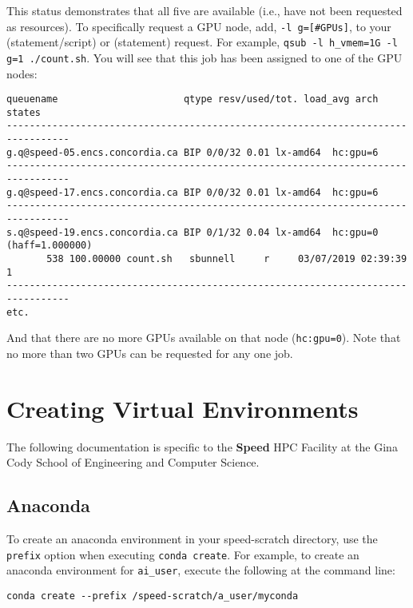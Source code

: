 \documentclass{easychair}
\begin{document}
This status demonstrates that all five are available (i.e., have not been 
requested as resources). To specifically request a GPU node, add,
\texttt{-l g=[\#GPUs]}, to your  (statement/script) or
 (statement) request. For example,
\texttt{qsub -l h\_vmem=1G -l g=1 ./count.sh}. You 
will see that this job has been assigned to one of the GPU nodes:

\small
\begin{verbatim}
queuename                      qtype resv/used/tot. load_avg arch          states
--------------------------------------------------------------------------------- 
g.q@speed-05.encs.concordia.ca BIP 0/0/32 0.01 lx-amd64  hc:gpu=6 
--------------------------------------------------------------------------------- 
g.q@speed-17.encs.concordia.ca BIP 0/0/32 0.01 lx-amd64  hc:gpu=6 
--------------------------------------------------------------------------------- 
s.q@speed-19.encs.concordia.ca BIP 0/1/32 0.04 lx-amd64  hc:gpu=0 (haff=1.000000) 
       538 100.00000 count.sh   sbunnell     r     03/07/2019 02:39:39     1
---------------------------------------------------------------------------------
etc. 
\end{verbatim}
\normalsize

And that there are no more GPUs available on that node (\texttt{hc:gpu=0}). Note
that no more than two GPUs can be requested for any one job. 

\section{Creating Virtual Environments}
\label{sect:environments}

The following documentation is specific to the \textbf{Speed} HPC Facility at the
 Gina Cody School of Engineering and Computer Science.

\subsection{Anaconda}
To create an anaconda environment in your speed-scratch directory, use the \texttt{\-\-prefix} 
option when executing  \texttt{conda create}. For example, to create an anaconda environment for 
 \texttt{ai\_user}, execute the following at the command line:

\begin{verbatim}
conda create --prefix /speed-scratch/a_user/myconda
\end{verbatim}
\end{document}
